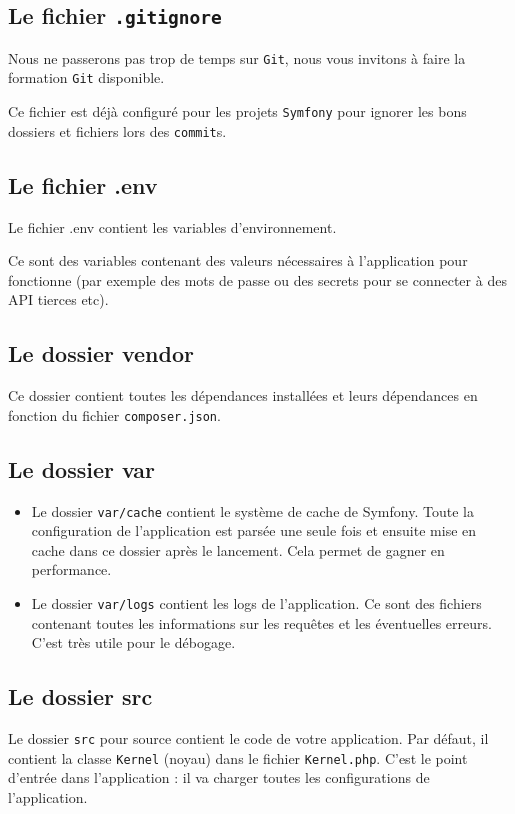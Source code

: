 \documentclass{article}
\begin{document}
\subsection{Le fichier {\tt .gitignore}}
Nous ne passerons pas trop de temps sur {\tt Git}, nous vous invitons à faire la formation {\tt Git} disponible.

Ce fichier est déjà configuré pour les projets {\tt Symfony} pour ignorer les bons dossiers et fichiers lors des {\tt commit}s.

\subsection{Le fichier .env}
Le fichier .env contient les variables d'environnement.

Ce sont des variables contenant des valeurs nécessaires à l'application pour fonctionne (par exemple des mots de passe ou des secrets pour se connecter à des API tierces etc).

\subsection{Le dossier vendor}
Ce dossier contient toutes les dépendances installées et leurs dépendances en fonction du fichier {\tt composer.json}.

\subsection{Le dossier var}
\begin{itemize}
\item Le dossier {\tt var/cache} contient le système de cache de Symfony. Toute la configuration de l'application est parsée une seule fois et ensuite mise en cache dans ce dossier après le lancement. Cela permet de gagner en performance.

\item Le dossier {\tt var/logs} contient les logs de l'application. Ce sont des fichiers contenant toutes les informations sur les requêtes et les éventuelles erreurs. C'est très utile pour le débogage.
\end{itemize}
\subsection{Le dossier src}
Le dossier {\tt src} pour source contient le code de votre application. Par défaut, il contient la classe {\tt Kernel} (noyau) dans le fichier {\tt Kernel.php}. C'est le point d'entrée dans l'application : il va charger toutes les configurations de l'application.
\end{document}
